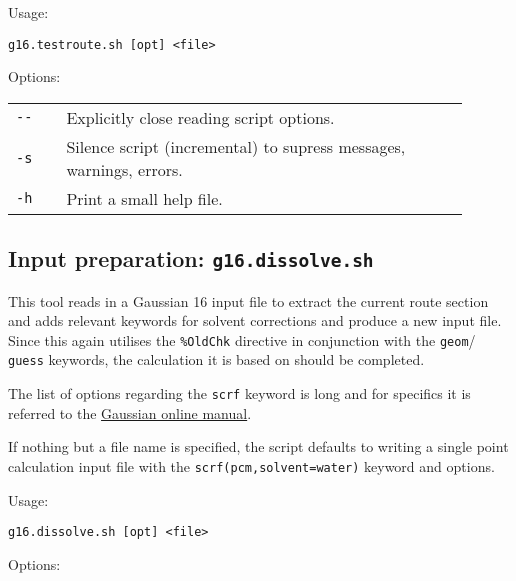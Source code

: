 \documentclass[   %
  final,          %
  a4paper         %
]{article}
\begin{document}
Usage: 

\lstinline`g16.testroute.sh [opt] <file>`

Options:

\begin{tabular}{p{0.1\linewidth}p{0.8\linewidth}}
  {\lstinline`--`}       & Explicitly close reading script options. \\
  {\lstinline`-s`}       & Silence script (incremental) to supress messages, warnings, errors. \\
  {\lstinline`-h`}       & Print a small help file. \\
\end{tabular}

\subsection{Input preparation: \texorpdfstring{{\lstinline`g16.dissolve.sh`}}{g16.dissolve.sh}}

This tool reads in a Gaussian 16 input file to extract the current route section
and adds relevant keywords for solvent corrections and produce a new input file.
Since this again utilises the \texttt{\%OldChk} directive in conjunction with 
the \texttt{geom}/ \texttt{guess} keywords, the calculation it is based on should be completed.

The list of options regarding the \texttt{scrf} keyword is long and for specifics
it is referred to the \href{http://gaussian.com/scrf/}{Gaussian online manual}.

If nothing but a file name is specified, the script defaults to writing
a single point calculation input file with the \texttt{scrf(pcm,solvent=water)} keyword and options.

Usage: 

\lstinline`g16.dissolve.sh [opt] <file>`

Options:
\end{document}
